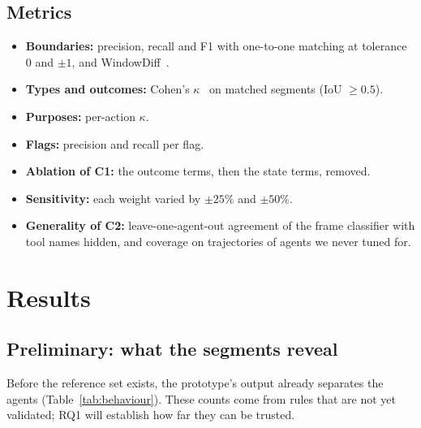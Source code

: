 \documentclass[sigconf,nonacm,10pt]{acmart}
\begin{document}
\subsection{Metrics}
\begin{itemize}
  \item \textbf{Boundaries:} precision, recall and F1 with one-to-one matching at
        tolerance 0 and $\pm1$, and WindowDiff~\cite{pevzner2002windowdiff}.
  \item \textbf{Types and outcomes:} Cohen's $\kappa$~\cite{cohen1960kappa} on matched
        segments (IoU $\ge 0.5$).
  \item \textbf{Purposes:} per-action $\kappa$.
  \item \textbf{Flags:} precision and recall per flag.
  \item \textbf{Ablation of C1:} the outcome terms, then the state terms, removed.
  \item \textbf{Sensitivity:} each weight varied by $\pm25\%$ and $\pm50\%$.
  \item \textbf{Generality of C2:} leave-one-agent-out agreement of the frame
        classifier with tool names hidden, and coverage on trajectories of agents we
        never tuned for.
\end{itemize}

\section{Results}
\label{sec:results}

\subsection{Preliminary: what the segments reveal}
Before the reference set exists, the prototype's output already separates the agents
(Table~\ref{tab:behaviour}). These counts come from rules that are not yet validated;
RQ1 will establish how far they can be trusted.
\end{document}
